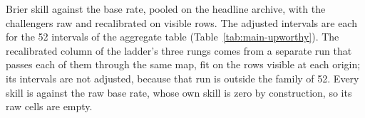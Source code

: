 \begin{table}[t]\centering\scriptsize
\caption{Brier skill against the base rate, pooled on the headline archive, with the challengers raw and recalibrated on visible rows. The adjusted intervals are each for the 52 intervals of the aggregate table (Table~\ref{tab:main-upworthy}). The recalibrated column of the ladder's three rungs comes from a separate run that passes each of them through the same map, fit on the rows visible at each origin; its intervals are not adjusted, because that run is outside the family of 52. Every skill is against the raw base rate, whose own skill is zero by construction, so its raw cells are empty.}
\label{tab:fmt-challengers}
\resizebox{\columnwidth}{!}{%
}
\end{table}


